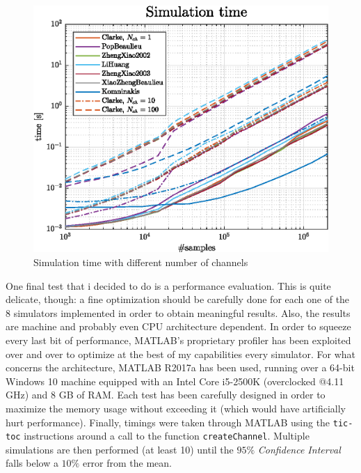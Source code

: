\begin{figure}
	\centering
	\includegraphics[width=\linewidth]{img/multiSimTime.eps}
	
	\caption{Simulation time with different number of channels}
	\label{fig:multiSimTime}
\end{figure}

One final test that i decided to do is a performance evaluation. This is quite delicate, though: a fine optimization should be carefully done for each one of the 8 simulators implemented in order to obtain meaningful results. Also, the results are machine and probably even CPU architecture dependent. In order to squeeze every last bit of performance, MATLAB's proprietary profiler has been exploited over and over to optimize at the best of my capabilities every simulator. For what concerns the architecture, MATLAB R2017a has been used, running over a 64-bit Windows 10 machine equipped with an Intel Core i5-2500K (overclocked @4.11 GHz) and 8 GB of RAM. Each test has been carefully designed in order to maximize the memory usage without exceeding it (which would have artificially hurt performance). Finally, timings were taken through MATLAB using the \texttt{tic-toc} instructions around a call to the function \texttt{createChannel}. Multiple simulations are then performed (at least 10) until the $95\%$ \textit{Confidence Interval} falls below a $10\%$ error from the mean.

